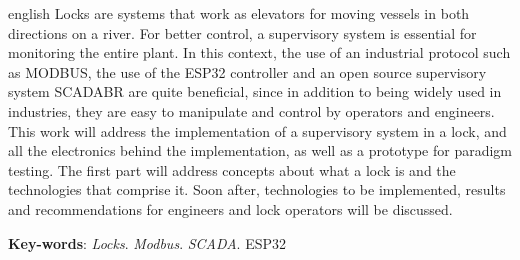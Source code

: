 \begin{resumo}[Abstract]
 \begin{otherlanguage*}{english}
   Locks are systems that work as elevators for moving vessels in both directions on a river. For better control, a supervisory system is essential for monitoring the entire plant. In this context, the use of an industrial protocol such as MODBUS, the use of the ESP32 controller and an open source supervisory system SCADABR are quite beneficial, since in addition to being widely used in industries, they are easy to manipulate and control by operators and engineers. This work will address the implementation of a supervisory system in a lock, and all the electronics behind the implementation, as well as a prototype for paradigm testing. The first part will address concepts about what a lock is and the technologies that comprise it. Soon after, technologies to be implemented, results and recommendations for engineers and lock operators will be discussed.
   \vspace{\onelineskip}
 
   \noindent 
   \textbf{Key-words}: \textit{Locks}. \textit{Modbus}. \textit{SCADA}. ESP32
 \end{otherlanguage*}
\end{resumo}
